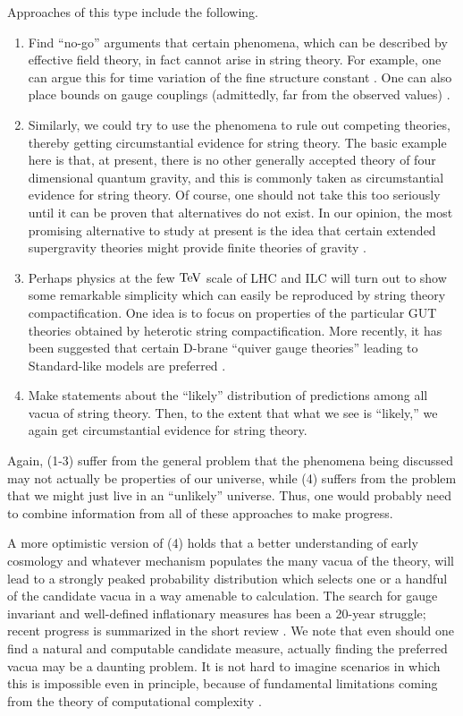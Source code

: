 \documentclass[aps,amsfonts]{ar2e}
\begin{document}
Approaches of this type include the following.
\begin{enumerate}
\item Find ``no-go'' arguments that certain phenomena, which can be
described by effective field theory, in fact cannot arise in string
theory.  For example, one can argue this for time variation of the
fine structure constant \cite{Banks:2001qc}.  One can also place bounds
on gauge couplings (admittedly, far from the observed values)
\cite{Arkani-Hamed:2006dz}.
\item Similarly, we could try to use the phenomena to
rule out competing theories, thereby getting circumstantial evidence
for string theory.  The basic example here is that, at present,
there is no other generally accepted theory of four dimensional
quantum gravity, and this is commonly taken as circumstantial
evidence for string theory.  Of course, one should not take this too
seriously until it can be proven that alternatives do not exist.  In
our opinion, the most promising alternative to study at present is
the idea that certain extended supergravity theories might provide
finite theories of gravity
\cite{Bern:2006kd,Green:2006yu}.
\item Perhaps physics at the few ${\rm TeV}$ scale of LHC and ILC
will turn out to show some remarkable simplicity which can easily be
reproduced by string theory compactification.  One idea is to focus
on properties of the particular
GUT theories obtained by heterotic string compactification.
More recently, it has been suggested that certain D-brane
``quiver gauge theories'' leading to Standard-like
models are preferred
\cite{Berenstein:2006pk,Verlinde:2005jr}.
\item Make statements about the ``likely'' distribution of predictions
among all vacua of string theory.  Then, to the extent that what we
see is ``likely,'' we again get circumstantial evidence for string
theory.
\end{enumerate}
Again, (1-3) suffer from the general problem that the
phenomena being discussed may not actually be properties of our
universe, while (4) suffers from the problem that we might just live
in an ``unlikely'' universe.  Thus, one would probably need to
combine information from all of these approaches to make progress.

A more optimistic version of (4) holds that a better understanding of
early cosmology and whatever mechanism populates the many vacua of the
theory, will lead to a strongly peaked probability distribution which
selects one or a handful of the candidate vacua in a way amenable to
calculation.  The search for gauge invariant and well-defined
inflationary measures has been a 20-year struggle; recent progress is
summarized in the short review \cite{Vilenkin:2006xv}.  We note that
even should one find a natural and computable candidate measure,
actually finding the preferred vacua may be a daunting problem.
It is not hard to imagine scenarios in which this is
impossible even in principle, because of fundamental limitations
coming from the theory of computational complexity
\cite{Denef:2006ad}.
\end{document}
